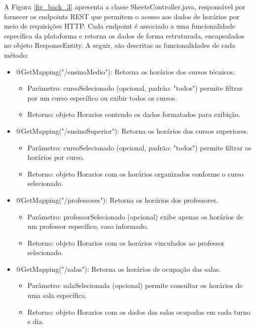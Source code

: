 \begin{itemize}
    A Figura \ref{fig_back_3} apresenta a classe SheetsController.java, responsável por fornecer os endpoints REST que permitem o acesso aos dados de horários por meio de requisições HTTP. Cada endpoint é associado a uma funcionalidade específica da plataforma e retorna os dados de forma estruturada, encapsulados no objeto ResponseEntity. A seguir, são descritas as funcionalidades de cada método:
    \begin{itemize}
        \item @GetMapping("/ensinoMedio"): Retorna os horários dos cursos técnicos.
        \begin{itemize}
            \item Parâmetro: cursoSelecionado (opcional, padrão: "todos") permite filtrar por um curso específico ou exibir todos os cursos.
            \item Retorno: objeto Horarios contendo os dados formatados para exibição.
        \end{itemize}
        \item @GetMapping("/ensinoSuperior"): Retorna os horários dos cursos superiores.
        \begin{itemize}
            \item Parâmetro: cursoSelecionado (opcional, padrão: "todos") permite filtrar os horários por curso.
            \item Retorno: objeto Horarios com os horários organizados conforme o curso selecionado.
        \end{itemize}
        \item @GetMapping("/professores"): Retorna os horários dos professores.
        \begin{itemize}
            \item Parâmetro: professorSelecionado (opcional) exibe apenas os horários de um professor específico, caso informado.
            \item Retorno: objeto Horarios com os horários vinculados ao professor selecionado.
        \end{itemize}
        \item @GetMapping("/salas"): Retorna os horários de ocupação das salas.
        \begin{itemize}
            \item Parâmetro: salaSelecionada (opcional) permite consultar os horários de uma sala específica.
            \item Retorno: objeto Horarios com os dados das salas ocupadas em cada turno e dia.
        \end{itemize}

\end{itemize}
\end{itemize}
